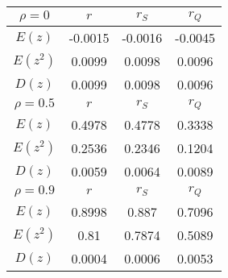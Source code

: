 \begin{tabular}{| c | c | c | c |} \hline
$\rho = 0$ & $r$ & $r_S$ & $r_Q$ \\ \hline 
$E(z)$ & -0.0015 & -0.0016 & -0.0045 \\ 
$E(z^2)$ & 0.0099 & 0.0098 & 0.0096 \\ 
$D(z)$ & 0.0099 & 0.0098 & 0.0096 \\ \hline 
$\rho = 0.5$ & $r$ & $r_S$ & $r_Q$ \\ \hline 
$E(z)$ & 0.4978 & 0.4778 & 0.3338 \\ 
$E(z^2)$ & 0.2536 & 0.2346 & 0.1204 \\ 
$D(z)$ & 0.0059 & 0.0064 & 0.0089 \\ \hline 
$\rho = 0.9$ & $r$ & $r_S$ & $r_Q$ \\ \hline 
$E(z)$ & 0.8998 & 0.887 & 0.7096 \\ 
$E(z^2)$ & 0.81 & 0.7874 & 0.5089 \\ 
$D(z)$ & 0.0004 & 0.0006 & 0.0053 \\ \hline 
\end{tabular}